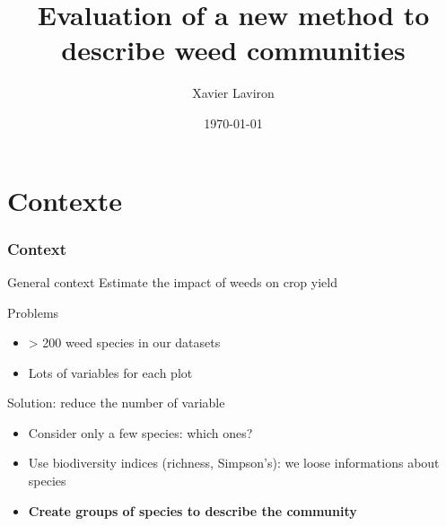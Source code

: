 \documentclass[]{beamer}
\author{Xavier Laviron}
\title[Lab Meeting]{
  Evaluation of a new method to describe weed communities
}
\date{\today}
\begin{document}
\frame[plain]{\titlepage}




\section{Contexte}

\begin{frame}
  \frametitle{Context}

  \begin{block}{General context}
    Estimate the impact of weeds on crop yield
  \end{block}

  \begin{block}{Problems}
    \begin{itemize}
      \item > 200 weed species in our datasets
      \item Lots of variables for each plot
    \end{itemize}
  \end{block}

  \begin{block}{Solution: reduce the number of variable}
    \begin{itemize}
      \item Consider only a few species: which ones?
      \item Use biodiversity indices (richness, Simpson's): we loose
        informations about species
      \item \textbf<1->{\textcolor<1->{greenbop}{Create groups of species to
        describe the community}}
    \end{itemize}
  \end{block}

\end{frame}

\end{document}
